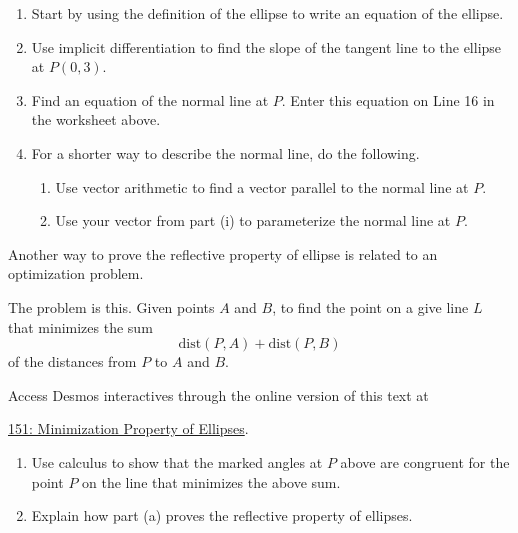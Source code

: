 \documentclass{ximera}
\begin{document}
\begin{question}
\begin{enumerate}
\item Start by using the definition of the ellipse to write an equation of the ellipse.

\item Use implicit differentiation to find the slope of the tangent line to the ellipse at $P(0,3)$.

\item Find an equation of the normal line at $P$. Enter this equation on Line 16 in the worksheet above. 

\item For a shorter way to describe the normal line, do the following.

\begin{enumerate}
\item Use vector arithmetic to find a vector parallel to the normal line at $P$.

\item Use your vector from part (i) to parameterize the normal line at $P$.

\end{enumerate}
\end{enumerate}
\end{question}


\begin{question}  \label{Q5445rggfbhyhyrdt}

Another way to prove the reflective property of ellipse is related to an optimization problem.

The problem is this. Given points $A$ and $B$, to find the point on a give line $L$ that minimizes the sum 
\[
   \text{dist}(P,A) + \text{dist}(P,B)
\]
of the distances from $P$ to $A$ and $B$.

\begin{onlineOnly}
    \begin{center}
\end{center}
\end{onlineOnly}

Access Desmos interactives through the online version of this text at
 
\href{https://https://www.desmos.com/calculator/vxqdjba3hm}{151: Minimization Property of Ellipses}.

\begin{enumerate}
\item Use calculus to show that the marked angles at $P$ above are congruent for the point $P$ on the line that minimizes the above sum.

\item Explain how part (a) proves the reflective property of ellipses.
\end{enumerate}




\end{question}
\end{document}
